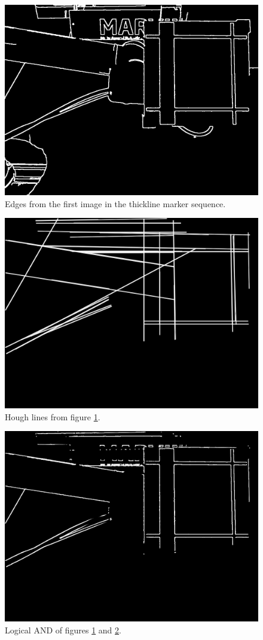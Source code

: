 \documentclass[]{scrartcl}
\begin{document}
\begin{figure}
	\centering
	\includegraphics[width=0.7\linewidth]{fig/bin1-1.png}
	\caption{Edges from the first image in the thickline marker sequence.}
	\label{fig:bin2}
\end{figure}

\begin{figure}
	\centering
	\includegraphics[width=0.7\linewidth]{fig/lin1-1.png}
	\caption{Hough lines from figure \ref{fig:bin2}.}
	\label{fig:lin2}
\end{figure}

\begin{figure}
	\centering
	\includegraphics[width=0.7\linewidth]{fig/and1-1.png}
	\caption{Logical AND of figures \ref{fig:bin2} and \ref{fig:lin2}.}
	\label{fig:and2}
\end{figure}
\end{document}
